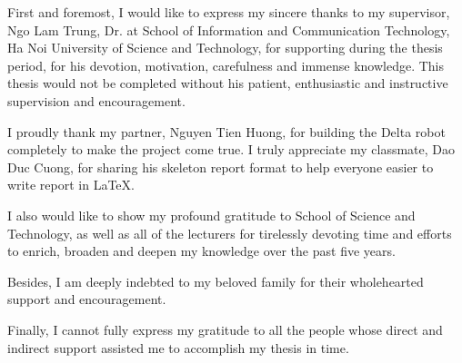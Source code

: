 \begin{acknowledgement}
First and foremost, I would like to express my sincere thanks to my supervisor, Ngo Lam Trung, Dr. at School of Information and Communication Technology, Ha Noi University of Science and Technology, for supporting during the thesis period, for his devotion, motivation, carefulness and immense knowledge. This thesis would not be completed without his patient, enthusiastic and instructive supervision and encouragement.

I proudly thank my partner, Nguyen Tien Huong, for building the Delta robot completely to make the project come true. I truly appreciate my classmate, Dao Duc Cuong, for sharing his skeleton report format to help everyone easier to write report in \LaTeX.

I also would like to show my profound gratitude to School of Science and Technology, as well as all of the lecturers for tirelessly devoting time and efforts to enrich, broaden and deepen my knowledge over the past five years.

Besides, I am deeply indebted to my beloved family for their wholehearted support and encouragement.

Finally, I cannot fully express my gratitude to all the people whose
direct and indirect support assisted me to accomplish my thesis in time.
\end{acknowledgement}